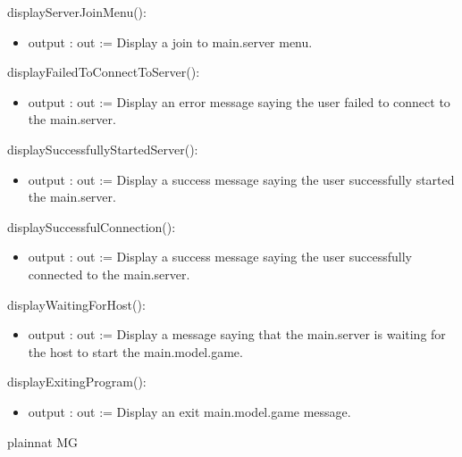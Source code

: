\documentclass[12pt, titlepage]{article}
\begin{document}
        \noindent displayServerJoinMenu():
        \begin{itemize}
        \item output : out := Display a join to main.server menu.
        \end{itemize}
        
        \noindent displayFailedToConnectToServer():
        \begin{itemize}
        \item output : out := Display an error message saying the user failed to connect to the main.server.
        \end{itemize}
        
        \noindent displaySuccessfullyStartedServer():
        \begin{itemize}
        \item output : out := Display a success message saying the user successfully started the main.server.
        \end{itemize}
        
        \noindent displaySuccessfulConnection():
        \begin{itemize}
        \item output : out := Display a success message saying the user successfully connected to the main.server.
        \end{itemize}
        
        \noindent displayWaitingForHost():
        \begin{itemize}
        \item output : out := Display a message saying that the main.server is waiting for the host to start the main.model.game.
        \end{itemize}
        
        \noindent displayExitingProgram():
        \begin{itemize}
        \item output : out := Display an exit main.model.game message.
        \end{itemize}
        

 {plainnat}
 {MG}
\end{document}
